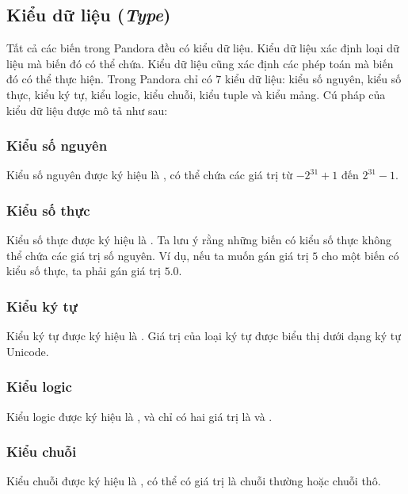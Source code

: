 \subsection{Kiểu dữ liệu (\textit{Type})}

Tất cả các biến trong Pandora đều có kiểu dữ liệu. Kiểu dữ liệu xác định loại dữ liệu mà biến đó có thể chứa. Kiểu dữ liệu cũng xác định các phép toán mà biến đó có thể thực hiện. Trong Pandora chỉ có 7 kiểu dữ liệu: kiểu số nguyên, kiểu số thực, kiểu ký tự, kiểu logic, kiểu chuỗi, kiểu tuple và kiểu mảng. Cú pháp của kiểu dữ liệu được mô tả như sau:

\regexty

\subsubsection{Kiểu số nguyên}

    Kiểu số nguyên được ký hiệu là , có thể chứa các giá trị từ $-2^{31}+1$ đến $2^{31}-1$.

\subsubsection{Kiểu số thực}

    Kiểu số thực được ký hiệu là . Ta lưu ý rằng những biến có kiểu số thực không thể chứa các giá trị số nguyên. Ví dụ, nếu ta muốn gán giá trị $5$ cho một biến có kiểu số thực, ta phải gán giá trị $5.0$.

\subsubsection{Kiểu ký tự}

    Kiểu ký tự được ký hiệu là . Giá trị của loại ký tự được biểu thị dưới dạng ký tự Unicode.

\subsubsection{Kiểu logic}

    Kiểu logic được ký hiệu là , và chỉ có hai giá trị là  và .

\subsubsection{Kiểu chuỗi}

    Kiểu chuỗi được ký hiệu là , có thể có giá trị là chuỗi thường hoặc chuỗi thô.

